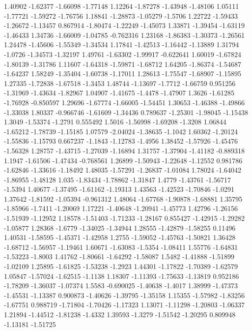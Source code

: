 \documentclass[9pt]{article}
\theoremstyle{plain}
\theoremstyle{definition}
\theoremstyle{remark}
\numberwithin{equation}{section}
\begin{document}
1.40902
-1.62377
-1.66098
-1.77148
1.12264
-1.87278
-1.43948
-1.48106
1.05111
-1.77721
-1.59272
-1.76756
1.18841
-1.28873
-1.05279
-1.5706
1.22722
-1.59433
-1.26672
-1.13457
0.867914
-1.80474
-1.22249
-1.45073
1.33871
-1.39454
-1.63119
-1.46433
1.34736
-1.66009
-1.04785
-0.762316
1.23168
-1.86383
-1.30373
-1.26561
1.24478
-1.45606
-1.55349
-1.34534
1.17841
-1.42513
-1.16442
-1.13889
1.31794
-1.0726
-1.34573
-1.32197
1.49761
-1.63302
-1.99917
-0.622641
1.60019
-1.67824
-1.80139
-1.31786
1.11607
-1.64318
-1.59871
-1.68712
1.64205
-1.86374
-1.54687
-1.64237
1.58249
-1.35404
-1.60738
-1.17011
1.28613
-1.75547
-1.68907
-1.15895
1.27335
-1.72838
-1.67518
-1.3453
1.48744
-1.13697
-1.7712
-1.66759
0.951256
-1.31969
-1.43634
-1.82967
1.04907
-1.41675
-1.4478
-1.47907
1.3626
-1.61285
-1.76928
-0.850597
1.29696
-1.67774
-1.66005
-1.54451
1.30653
-1.46388
-1.49866
-1.33038
1.80337
-0.966746
-1.61609
-1.34436
0.789637
-1.25301
-1.98045
-1.15438
1.3049
-1.53374
-1.2791
0.555492
1.5016
-1.56998
-1.69208
-1.3208
1.06844
-1.65212
-1.78739
-1.15185
1.07579
-2.04024
-1.38635
-1.1042
1.60362
-1.20124
-1.55836
-1.15793
0.667237
-1.1843
-1.12783
-1.4956
1.38452
-1.57926
-1.45476
-1.56328
1.28757
-1.43715
-1.27039
-1.16894
1.31757
-1.37904
-1.41182
-0.889318
1.1947
-1.61506
-1.47434
-0.768561
1.26899
-1.50943
-1.22648
-1.12552
0.981786
-1.62846
-1.33616
-1.18492
1.48035
-1.57291
-1.26837
-1.01084
1.78024
-1.64042
-1.86955
-1.48128
1.035
-1.83434
-1.78862
-1.31847
1.4779
-1.43761
-1.56717
-1.5394
1.40677
-1.37495
-1.61162
-1.19313
1.43563
-1.42523
-1.70846
-1.0291
1.37642
-1.81592
-1.05394
-0.961312
1.48064
-1.67768
-1.90878
-1.68881
1.35795
-1.85966
-1.7411
-1.20069
1.17221
-1.40648
-1.20941
-1.45773
1.42796
-1.26156
-1.51939
-1.12952
1.18578
-1.51403
-1.71233
-1.28167
0.855427
-1.42915
-1.29282
-1.05877
1.28368
-1.6779
-1.34025
-1.34944
1.28555
-1.42879
-1.58255
0.11496
1.40531
-1.58595
-1.45371
-1.42958
1.2755
-1.59052
-1.45763
-1.50821
1.36428
-1.68712
-1.56957
-1.19461
1.60671
-1.63083
-1.5354
-1.08411
1.55776
-1.64831
-1.53223
-1.8003
1.41762
-1.80661
-1.64292
-1.58087
1.5482
-1.41888
-1.51899
-1.02109
1.25895
-1.61825
-1.53238
-1.2923
1.44301
-1.17822
-1.70389
-1.62579
1.05847
-1.57024
-1.62515
-1.1138
1.18307
-1.11393
-1.75633
-1.13819
0.952186
-1.78209
-1.36037
-1.07374
1.5583
-0.690025
-1.40638
-1.4017
1.38999
-1.47373
-1.45531
-1.13387
0.900873
-1.40626
-1.39795
-1.35158
1.15355
-1.57982
-1.83256
-1.67751
0.988719
-1.71804
-1.70426
-1.17323
1.13071
-1.11298
-1.20803
-1.06337
1.21894
-1.44512
-1.81238
-1.4332
1.39593
-1.3279
-1.51542
-1.20295
0.809948
-1.13181
-1.51725
\end{document}
